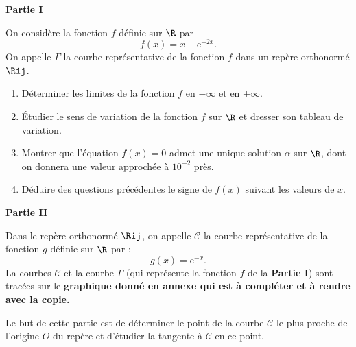 \begin{center}\textbf{Partie I}\end{center}

On considère la fonction $f$ définie sur $\R$ par \[f(x) = x - \text{e}^{-2x}.\]
%
On appelle $\Gamma$ la courbe représentative de la fonction $f$ dans un repère orthonormé $\Rij$.

\begin{enumerate}
	\item Déterminer les limites de la fonction $f$ en $- \infty$ et en $+ \infty$.
	\item Étudier le sens de variation de la fonction $f$ sur $\R$ et dresser son tableau de variation.
	\item Montrer que l'équation $f(x) = 0$ admet une unique solution $\alpha$ sur $\R$, dont on donnera une valeur approchée à $10^{-2}$ près.
	\item Déduire des questions précédentes le signe de $f(x)$ suivant les valeurs de $x$.
\end{enumerate}

\begin{center}\textbf{Partie II}\end{center}

Dans le repère orthonormé $\Rij$, on appelle $\mathcal{C}$ la courbe représentative de la fonction $g$ définie sur $\R$ par : \[g(x) = \text{e}^{-x}.\]
%
La courbes $\mathcal{C}$ et la courbe $\Gamma$ (qui représente la fonction $f$ de la \textbf{Partie I}) sont tracées sur le \textbf{graphique donné en annexe qui est à compléter et à rendre avec la copie.}

\smallskip

Le but de cette partie est de déterminer le point de la courbe $\mathcal{C}$ le plus proche de l'origine $O$ du repère et d'étudier la tangente à $\mathcal{C}$ en ce point.

